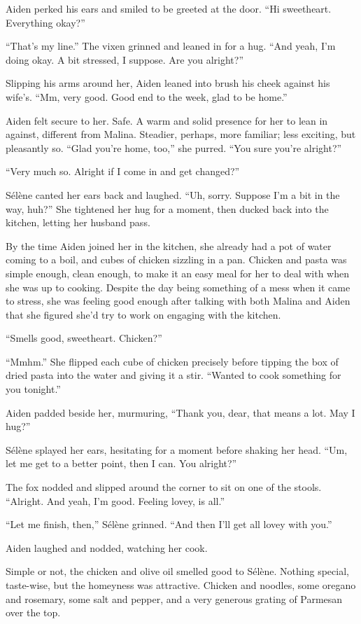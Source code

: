 Aiden perked his ears and smiled to be greeted at the door. ``Hi sweetheart. Everything okay?''

``That's my line.'' The vixen grinned and leaned in for a hug. ``And yeah, I'm doing okay. A bit stressed, I suppose. Are you alright?''

Slipping his arms around her, Aiden leaned into brush his cheek against his wife's. ``Mm, very good. Good end to the week, glad to be home.''

Aiden felt secure to her. Safe. A warm and solid presence for her to lean in against, different from Malina. Steadier, perhaps, more familiar; less exciting, but pleasantly so. ``Glad you're home, too,'' she purred. ``You sure you're alright?''

``Very much so. Alright if I come in and get changed?''

Sélène canted her ears back and laughed. ``Uh, sorry. Suppose I'm a bit in the way, huh?'' She tightened her hug for a moment, then ducked back into the kitchen, letting her husband pass.

By the time Aiden joined her in the kitchen, she already had a pot of water coming to a boil, and cubes of chicken sizzling in a pan. Chicken and pasta was simple enough, clean enough, to make it an easy meal for her to deal with when she was up to cooking. Despite the day being something of a mess when it came to stress, she was feeling good enough after talking with both Malina and Aiden that she figured she'd try to work on engaging with the kitchen.

``Smells good, sweetheart. Chicken?''

``Mmhm.'' She flipped each cube of chicken precisely before tipping the box of dried pasta into the water and giving it a stir. ``Wanted to cook something for you tonight.''

Aiden padded beside her, murmuring, ``Thank you, dear, that means a lot. May I hug?''

Sélène splayed her ears, hesitating for a moment before shaking her head. ``Um, let me get to a better point, then I can. You alright?''

The fox nodded and slipped around the corner to sit on one of the stools. ``Alright. And yeah, I'm good. Feeling lovey, is all.''

``Let me finish, then,'' Sélène grinned. ``And then I'll get all lovey with you.''

Aiden laughed and nodded, watching her cook.

Simple or not, the chicken and olive oil smelled good to Sélène. Nothing special, taste-wise, but the homeyness was attractive. Chicken and noodles, some oregano and rosemary, some salt and pepper, and a very generous grating of Parmesan over the top.

